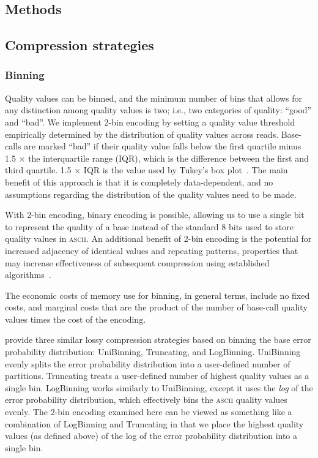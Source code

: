 \documentclass{bioinfo}
\begin{document}
\begin{methods}
\section{Methods}

\subsection{Compression strategies}

\subsubsection{Binning}

Quality values can be binned, and the minimum number of bins that
allows for any distinction among quality values is two; i.e., two
categories of quality: ``good'' and ``bad''. We implement 2-bin
encoding by setting a quality value threshold empirically determined
by the distribution of quality values across reads. Base-calls are
marked ``bad'' if their quality value falls below the first quartile
minus 1.5 $\times$ the interquartile range (IQR), which is the
difference between the first and third quartile. 1.5 $\times$ IQR is
the value used by Tukey's box plot~\citep{mcgill1978variations}. The
main benefit of this approach is that it is completely data-dependent,
and no assumptions regarding the distribution of the quality values
need to be made.
 
With 2-bin encoding, binary encoding is possible, allowing us to use a
single bit to represent the quality of a base instead of the standard
8 bits used to store quality values in \textsc{ascii}. An additional
benefit of 2-bin encoding is the potential for increased adjacency of
identical values and repeating patterns, properties that may increase
effectiveness of subsequent compression using established
algorithms~\cite[e.g.,][]{HUFFMAN:1952nr,Ziv77auniversal,
  DBLP:journals/tit/ZivL78}.

The economic costs of memory use for binning, in general terms,
include no fixed costs, and marginal costs that are the product of the
number of base-call quality values times the cost of the encoding.

\cite{Wan:2012kq} provide three similar lossy compression strategies
based on binning the base error probability distribution: UniBinning,
Truncating, and LogBinning. UniBinning evenly splits the error
probability distribution into a user-defined number of partitions.
Truncating treats a user-defined number of highest quality values as a
single bin. LogBinning works similarly to UniBinning, except it uses
the \emph{log} of the error probability distribution, which
effectively bins the \textsc{ascii} quality values evenly. The 2-bin
encoding examined here can be viewed as something like a combination
of LogBinning and Truncating in that we place the highest quality
values (as defined above) of the log of the error probability
distribution into a single bin.


\end{methods}
\end{document}

